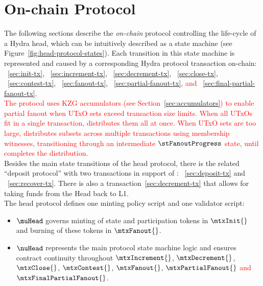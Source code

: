 \clearpage
\section{On-chain Protocol}\label{sec:on-chain}

\noindent The following sections describe the \emph{on-chain} protocol
controlling the life-cycle of a Hydra head, which can be intuitively described
as a state machine (see Figure~\ref{fig:head-protocol-states}). Each transition
in this state machine is represented and caused by a corresponding Hydra
protocol transaction
on-chain: \mtxInit{}~\ref{sec:init-tx}, \mtxIncrement{}~\ref{sec:increment-tx}, \mtxDecrement{}~\ref{sec:decrement-tx}, \mtxClose{}~\ref{sec:close-tx}, \mtxContest{}~\ref{sec:contest-tx}, \mtxFanout{}~\ref{sec:fanout-tx}, \textcolor{red}{\mtxPartialFanout{}~\ref{sec:partial-fanout-tx}, and \mtxFinalPartialFanout{}~\ref{sec:final-partial-fanout-tx}}. \\

\noindent \textcolor{red}{The protocol uses KZG accumulators (see Section~\ref{sec:accumulators}) to enable partial fanout when UTxO sets exceed transaction size limits. When all UTxOs fit in a single transaction, \mtxFanout{} distributes them all at once. When UTxO sets are too large, \mtxPartialFanout{} distributes subsets across multiple transactions using membership witnesses, transitioning through an intermediate $\stFanoutProgress$ state, until \mtxFinalPartialFanout{} completes the distribution.} \\

\noindent Besides the main state transitions of the head protocol, there is
the related ``deposit protocol'' with two transactions in support of
\mtxIncrement{}: \mtxDeposit{}~\ref{sec:deposit-tx} and \mtxRecover{}~\ref{sec:recover-tx}.
There is also a \mtxDecrement{} transaction~\ref{sec:decrement-tx} that allows for taking funds from the Head back to L1. \\


\noindent The head protocol defines one minting policy script and one
validator script:
\begin{itemize}
	\item $\muHead$ governs minting of state and participation tokens in
	      $\mtxInit{}$ and burning of these tokens in $\mtxFanout{}$.
	\item $\nuHead$ represents the main protocol state machine logic and ensures
	      contract continuity throughout $\mtxIncrement{}$, $\mtxDecrement{}$,
	      $\mtxClose{}$, $\mtxContest{}$, $\mtxFanout{}$, \textcolor{red}{$\mtxPartialFanout{}$ and $\mtxFinalPartialFanout{}$}.
\end{itemize}

